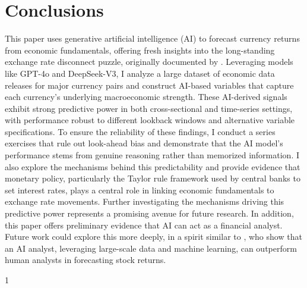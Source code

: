\documentclass[12pt,oneside,letter]{article}
\begin{document}
		\section{Conclusions}	\label{sec:Conclusions}
		This paper uses generative artificial intelligence (AI) to forecast currency returns from economic fundamentals, offering fresh insights into the long-standing exchange rate disconnect puzzle, originally documented by \citet{Meese/Rogoff:1983}. Leveraging models like GPT-4o and DeepSeek-V3, I analyze a large dataset of economic data releases for major currency pairs and construct AI-based variables that capture each currency’s underlying macroeconomic strength. These AI-derived signals exhibit strong predictive power in both cross-sectional and time-series settings, with performance robust to different lookback windows and alternative variable specifications. To ensure the reliability of these findings, I conduct a series exercises that rule out look-ahead bias and demonstrate that the AI model's performance stems from genuine reasoning rather than memorized information. I also explore the mechanisms behind this predictability and provide evidence that monetary policy, particularly the Taylor rule framework used by central banks to set interest rates, plays a central role in linking economic fundamentals to exchange rate movements. Further investigating the mechanisms driving this predictive power represents a promising avenue for future research. In addition, this paper offers preliminary evidence that AI can act as a financial analyst. Future work could explore this more deeply, in a spirit similar to \citet{CAO/ETAL:2024}, who show that an AI analyst, leveraging large-scale data and machine learning, can outperform human analysts in forecasting stock returns.


\newpage
\begin{spacing}{1}
\setlength{\bibsep}{8pt}
\raggedright
{}
%


\end{spacing}


\newpage
\clearpage
\end{document}
